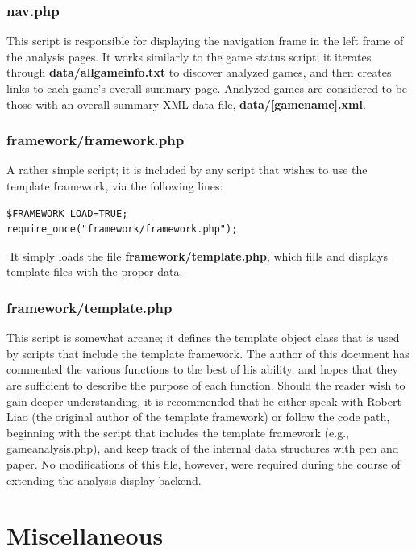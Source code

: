 \documentclass[11pt]{article}
\begin{document}
\subsubsection{nav.php}
This script is responsible for displaying the navigation frame in the left frame of the analysis pages. It works similarly to the game status script; it iterates through \textbf{data/allgameinfo.txt} to discover analyzed games, and then creates links to each game's overall summary page. Analyzed games are considered to be those with an overall summary XML data file, \textbf{data/[gamename].xml}.
\subsubsection{framework/framework.php}
A rather simple script; it is included by any script that wishes to use the template framework, via the following lines:
\begin{verbatim}
$FRAMEWORK_LOAD=TRUE;
require_once("framework/framework.php");
\end{verbatim} $ $  %
It simply loads the file \textbf{framework/template.php}, which fills and displays template files with the proper data.
\subsubsection{framework/template.php}
This script is somewhat arcane; it defines the template object class that is used by scripts that include the template framework. The author of this document has commented the various functions to the best of his ability, and hopes that they are sufficient to describe the purpose of each function. Should the reader wish to gain deeper understanding, it is recommended that he either speak with Robert Liao (the original author of the template framework) or follow the code path, beginning with the script that includes the template framework (e.g., gameanalysis.php), and keep track of the internal data structures with pen and paper. No modifications of this file, however, were required during the course of extending the analysis display backend.
\section{Miscellaneous}
\end{document}
